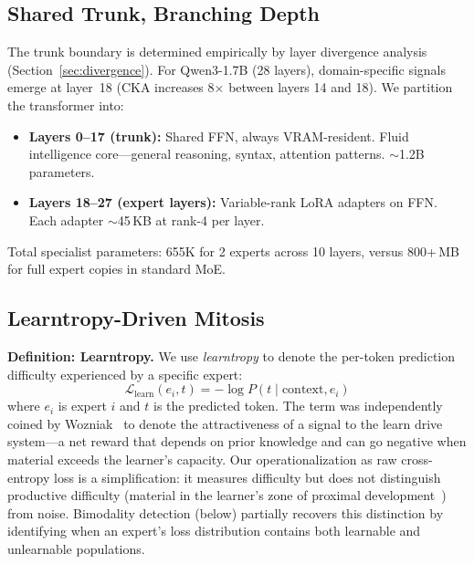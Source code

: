 \documentclass{article}
\begin{document}
\subsection{Shared Trunk, Branching Depth}

The trunk boundary is determined empirically by layer divergence analysis
(Section~\ref{sec:divergence}). For Qwen3-1.7B (28 layers), domain-specific
signals emerge at layer~18 (CKA increases 8$\times$ between layers 14 and 18).
We partition the transformer into:
\begin{itemize}
    \item \textbf{Layers 0--17 (trunk):} Shared FFN, always VRAM-resident.
          Fluid intelligence core---general reasoning, syntax, attention
          patterns. $\sim$1.2B parameters.
    \item \textbf{Layers 18--27 (expert layers):} Variable-rank LoRA adapters
          on FFN. Each adapter $\sim$45\,KB at rank-4 per layer.
\end{itemize}
Total specialist parameters: 655K for 2 experts across 10 layers, versus
800+\,MB for full expert copies in standard MoE.

\subsection{Learntropy-Driven Mitosis}

%
\textbf{Definition: Learntropy.} We use \emph{learntropy} to denote the per-token prediction difficulty experienced by a specific expert:
\begin{equation}
\mathcal{L}_{\text{learn}}(e_i, t) = -\log P(t \mid \text{context}, e_i)
\end{equation}
where $e_i$ is expert $i$ and $t$ is the predicted token. The term was independently coined by Wozniak~\cite{wozniak2018learntropy} to denote the attractiveness of a signal to the learn drive system---a net reward that depends on prior knowledge and can go negative when material exceeds the learner's capacity. Our operationalization as raw cross-entropy loss is a simplification: it measures difficulty but does not distinguish productive difficulty (material in the learner's zone of proximal development~\cite{vygotsky1978}) from noise. Bimodality detection (below) partially recovers this distinction by identifying when an expert's loss distribution contains both learnable and unlearnable populations.
\end{document}
